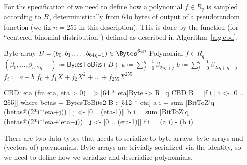 For the specification of \Kyber we need to define how a polynomial $f \in R_q$ 
is sampled according to $B_\eta$ deterministically from $64\eta$ bytes of output of a
pseudorandom function (we fix $n=256$ in this description). 
This is done by the function \CBD (for ``centered binomial distribution'')
defined as described in Algorithm~\ref{alg:cbd}.

\begin{algorithm}
  \caption{$\CBD_{\eta}\colon\Bytes^{64\eta} \rightarrow R_q$
  }
  \label{alg:cbd}
  \begin{algorithmic}
    \Require Byte array $B = (b_0, b_1, \dots ,b_{64\eta-1}) \in \Bytes^{64\eta}$ 
    \Ensure Polynomial $f \in R_q$
    \State $(\beta_0,\dots,\beta_{512\eta-1}) \coloneqq \mathsf{BytesToBits}(B)$
      \State $a \coloneqq \sum_{j=0}^{\eta-1}\beta_{2i\eta+j}$
      \State $b \coloneqq \sum_{j=0}^{\eta-1}\beta_{2i\eta+\eta+j}$
      \State $f_i \coloneqq a-b$
    \EndFor
    \State \Return $f_0 + f_1X + f_2X^2 + \dots + f_{255}X^{255}$
  \end{algorithmic}
\end{algorithm}

\begin{code}
  CBD: {eta} (fin eta, eta > 0) => [64 * eta]Byte -> R_q
  CBD B = [f i | i <- [0 .. 255]]
      where betas = BytesToBits2 B : [512 * eta]
            a i = sum [BitToZ`{q} (betas@(2*i*`eta+j)) | j <- [0 .. (eta-1)]]
            b i = sum [BitToZ`{q} (betas@(2*i*`eta+`eta+j)) | j <- [0 .. (eta-1)]]
            f i = (a i) - (b i)
\end{code}

There are two data types that \Kyber needs to serialize to byte arrays:
byte arrays and (vectors of) polynomials. Byte arrays are trivially serialized
via the identity, so we need to define how we serialize and deserialize polynomials.

